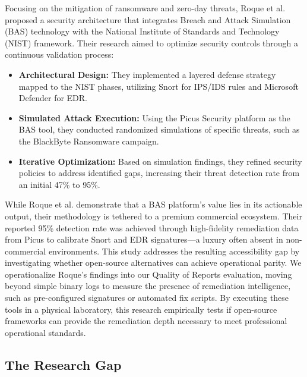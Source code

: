 Focusing on the mitigation of ransomware and zero-day threats, Roque et al. \cite{roque2024} proposed a security architecture that integrates Breach and Attack Simulation (BAS) technology with the National Institute of Standards and Technology (NIST) framework. Their research aimed to optimize security controls through a continuous validation process:
\begin{itemize}
    \item \textbf{Architectural Design:} They implemented a layered defense strategy mapped to the NIST phases, utilizing Snort for IPS/IDS rules and Microsoft Defender for EDR.
    \item \textbf{Simulated Attack Execution:} Using the Picus Security platform as the BAS tool, they conducted randomized simulations of specific threats, such as the BlackByte Ransomware campaign.
    \item \textbf{Iterative Optimization:} Based on simulation findings, they refined security policies to address identified gaps, increasing their threat detection rate from an initial 47\% to 95\%.
\end{itemize}

While Roque et al. demonstrate that a BAS platform's value lies in its actionable output, their methodology is tethered to a premium commercial ecosystem. Their reported 95\% detection rate was achieved through high-fidelity remediation data from Picus to calibrate Snort and EDR signatures—a luxury often absent in non-commercial environments. This study addresses the resulting accessibility gap by investigating whether open-source alternatives can achieve operational parity. We operationalize Roque’s findings into our Quality of Reports evaluation, moving beyond simple binary logs to measure the presence of remediation intelligence, such as pre-configured signatures or automated fix scripts. By executing these tools in a physical laboratory, this research empirically tests if open-source frameworks can provide the remediation depth necessary to meet professional operational standards.


\subsection{The Research Gap}

